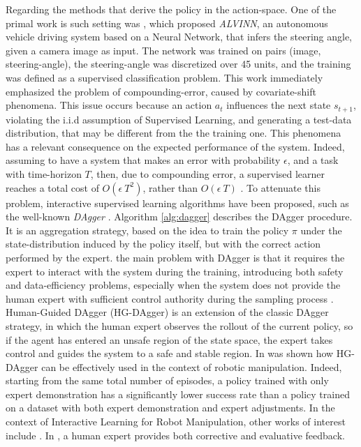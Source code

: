 Regarding the methods that derive the policy in the action-space. One of the primal work is such setting was \cite{pomerleau1988alvinn}, which proposed \textit{ALVINN}, an autonomous vehicle driving system based on a Neural Network, that infers the steering angle, given a camera image as input. The network was trained on pairs (image, steering-angle), the steering-angle was discretized over 45 units, and the training was defined as a supervised classification problem. This work immediately emphasized the problem of compounding-error, caused by covariate-shift phenomena. This issue occurs because an action $a_{t}$ influences the next state $s_{t+1}$, violating the i.i.d assumption of Supervised Learning, and generating a test-data distribution, that may be different from the the training one. This phenomena has a relevant consequence on the expected performance of the system. Indeed, assuming to have a system that makes an error with probability $\epsilon$, and a task with time-horizon $T$, then, due to compounding error, a supervised learner reaches a total cost of $O(\epsilon \ T^{2})$, rather than $O(\epsilon \ T)$ \cite{ross2010efficient_reductions,ross2011dagger}. To attenuate this problem, interactive supervised learning algorithms have been proposed, such as the well-known \textit{DAgger} \cite{ross2011dagger}. Algorithm \ref{alg:dagger} describes the DAgger procedure. It is an aggregation strategy, based on the idea to train the policy $\pi$ under the state-distribution induced by the policy itself, but with the correct action performed by the expert. the main problem with DAgger is that it requires the expert to interact with the system during the training, introducing both safety and data-efficiency problems, especially when the system does not provide the human expert with sufficient control authority during the sampling process \cite{laskey2017comparing_hc_rc}. 
\newline Human-Guided DAgger (HG-DAgger) \cite{kelly2019hg_dagger} is an extension of the classic DAgger strategy, in which the human expert observes the rollout of the current policy, so if the agent has entered an unsafe region of the state space, the expert takes control and guides the system to a safe and stable region. In \cite{jang2022bc_z} was shown how HG-DAgger can be effectively used in the context of robotic manipulation. Indeed, starting from the same total number of episodes, a policy trained with only expert demonstration has a significantly lower success rate than a policy trained on a dataset with both expert demonstration and expert adjustments. In the context of Interactive Learning for Robot Manipulation, other works of interest include \cite{mandlekar2020human_in_the_loop,chisari2022correct}. In \cite{chisari2022correct}, a human expert provides both corrective and evaluative feedback. %
